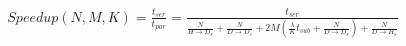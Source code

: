 \documentclass{standalone}
\begin{document}
\begin{equation*}
\begin{aligned}
Speedup(N, M, K) = \frac{t_{ser}}{t_{par}} = \frac
	{ t_{ser} }
	{ \frac{N}{H \rightarrow D_s} + \frac{N}{D \rightarrow D_s} + 2 M \left(\frac{\lambda}{K}t_{sub} + \frac{N}{D \rightarrow D_s} \right) + \frac{N}{D \rightarrow H_s} }
\end{aligned}
\end{equation*}
\end{document}
